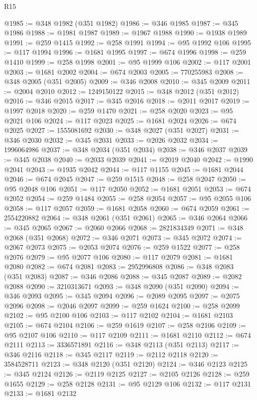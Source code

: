 \begin{lexlean}{R15}
\begin{coremodule}
{{{{{{{{{{{{{{{{{{{{{{{{{{{{{{{{{{{{{{{{{{{{{{{{{{{{{{{{{{{{{{{{{{{{{{@1985 := @348 @1982 (@351 @1982)
@1986 := @346 @1985
@1987 := @345 @1986
@1988 := @1981 @1987
@1989 := @1967 @1988
@1990 := @1938 @1989
@1991 := @259 @1415
@1992 := @258 @1991
@1994 := @95 @1992 @106
@1995 := @117 @1994
@1996 := @1681 @1995
@1997 := @674 @1996
@1998 := @259 @1410
@1999 := @258 @1998
@2001 := @95 @1999 @106
@2002 := @117 @2001
@2003 := @1681 @2002
@2004 := @674 @2003
@2005 := 770255983
@2008 := @348 @2005 (@351 @2005)
@2009 := @346 @2008
@2010 := @345 @2009
@2011 := @2004 @2010
@2012 := 1249150122
@2015 := @348 @2012 (@351 @2012)
@2016 := @346 @2015
@2017 := @345 @2016
@2018 := @2011 @2017
@2019 := @1997 @2018
@2020 := @259 @1470
@2021 := @258 @2020
@2023 := @95 @2021 @106
@2024 := @117 @2023
@2025 := @1681 @2024
@2026 := @674 @2025
@2027 := 1555081692
@2030 := @348 @2027 (@351 @2027)
@2031 := @346 @2030
@2032 := @345 @2031
@2033 := @2026 @2032
@2034 := 1996064986
@2037 := @348 @2034 (@351 @2034)
@2038 := @346 @2037
@2039 := @345 @2038
@2040 := @2033 @2039
@2041 := @2019 @2040
@2042 := @1990 @2041
@2043 := @1935 @2042
@2044 := @117 @1155
@2045 := @1681 @2044
@2046 := @674 @2045
@2047 := @259 @1515
@2048 := @258 @2047
@2050 := @95 @2048 @106
@2051 := @117 @2050
@2052 := @1681 @2051
@2053 := @674 @2052
@2054 := @259 @1484
@2055 := @258 @2054
@2057 := @95 @2055 @106
@2058 := @117 @2057
@2059 := @1681 @2058
@2060 := @674 @2059
@2061 := 2554220882
@2064 := @348 @2061 (@351 @2061)
@2065 := @346 @2064
@2066 := @345 @2065
@2067 := @2060 @2066
@2068 := 2821834349
@2071 := @348 @2068 (@351 @2068)
@2072 := @346 @2071
@2073 := @345 @2072
@2074 := @2067 @2073
@2075 := @2053 @2074
@2076 := @259 @1522
@2077 := @258 @2076
@2079 := @95 @2077 @106
@2080 := @117 @2079
@2081 := @1681 @2080
@2082 := @674 @2081
@2083 := 2952996808
@2086 := @348 @2083 (@351 @2083)
@2087 := @346 @2086
@2088 := @345 @2087
@2089 := @2082 @2088
@2090 := 3210313671
@2093 := @348 @2090 (@351 @2090)
@2094 := @346 @2093
@2095 := @345 @2094
@2096 := @2089 @2095
@2097 := @2075 @2096
@2098 := @2046 @2097
@2099 := @259 @1624
@2100 := @258 @2099
@2102 := @95 @2100 @106
@2103 := @117 @2102
@2104 := @1681 @2103
@2105 := @674 @2104
@2106 := @259 @1619
@2107 := @258 @2106
@2109 := @95 @2107 @106
@2110 := @117 @2109
@2111 := @1681 @2110
@2112 := @674 @2111
@2113 := 3336571891
@2116 := @348 @2113 (@351 @2113)
@2117 := @346 @2116
@2118 := @345 @2117
@2119 := @2112 @2118
@2120 := 3584528711
@2123 := @348 @2120 (@351 @2120)
@2124 := @346 @2123
@2125 := @345 @2124
@2126 := @2119 @2125
@2127 := @2105 @2126
@2128 := @259 @1655
@2129 := @258 @2128
@2131 := @95 @2129 @106
@2132 := @117 @2131
@2133 := @1681 @2132
}}}}}}}}}}}}}}}}}}}}}}}}}}}}}}}}}}}}}}}}}}}}}}}}}}}}}}}}}}}}}}}}}}}}}}
\end{coremodule}
\end{lexlean}
